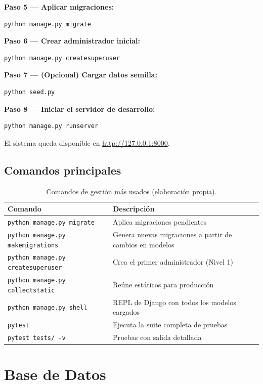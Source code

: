\documentclass[10pt,letterpaper]{report}
\begin{document}
\textbf{Paso 5 — Aplicar migraciones:}
\begin{lstlisting}
python manage.py migrate
\end{lstlisting}

\textbf{Paso 6 — Crear administrador inicial:}
\begin{lstlisting}
python manage.py createsuperuser
\end{lstlisting}

\textbf{Paso 7 — (Opcional) Cargar datos semilla:}
\begin{lstlisting}
python seed.py
\end{lstlisting}

\textbf{Paso 8 — Iniciar el servidor de desarrollo:}
\begin{lstlisting}
python manage.py runserver
\end{lstlisting}
El sistema queda disponible en \url{http://127.0.0.1:8000}.

\section{Comandos principales}

\begin{table}[H]
\centering
\caption{Comandos de gestión más usados (elaboración propia).}
\label{tab:comandos}
\begin{tabularx}{\textwidth}{l X}
\toprule
\textbf{Comando} & \textbf{Descripción} \\
\midrule
\texttt{python manage.py migrate} & Aplica migraciones pendientes \\
\texttt{python manage.py makemigrations} & Genera nuevas migraciones a partir de cambios en modelos \\
\texttt{python manage.py createsuperuser} & Crea el primer administrador (Nivel 1) \\
\texttt{python manage.py collectstatic} & Reúne estáticos para producción \\
\texttt{python manage.py shell} & REPL de Django con todos los modelos cargados \\
\texttt{pytest} & Ejecuta la suite completa de pruebas \\
\texttt{pytest tests/ -v} & Pruebas con salida detallada \\
\bottomrule
\end{tabularx}
\end{table}

\chapter{Base de Datos}
\end{document}
